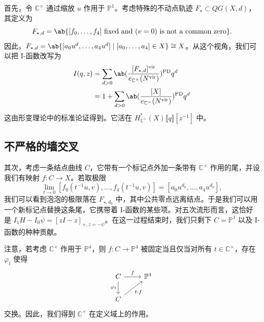 \documentclass{amsart}
\theoremstyle{definition}
\theoremstyle{remark}
\theoremstyle{plain}
\theoremstyle{definition}
\theoremstyle{remark}
\newcommand{\C}{\mathbb{C}}
\renewcommand{\P}{\mathbb{P}}
\newcommand{\mr}[1]{\mathrm{#1}}
\newcommand{\1}{\mathbf{1}}
\newcommand{\2}{\mathbf{2}}
\newcommand{\3}{\mathbf{3}}
\newcommand{\vir}{\mr{vir}}
\newcommand{\ps}[1]{\llbracket #1 \rrbracket}
\begin{document}
首先，令 \(\C^{\times}\) 通过缩放 \(u\) 作用于 \(\P^1\)。考虑特殊的不动点轨迹 \(F_{\star} \subset QG(X, d)\)，其定义为
\[ F_{\star,d} = \ab\{ [f_0, \ldots, f_4] \text{ fixed and } (v=0) \text{ is not a common zero} \}. \]
因此，\(F_{\star,d} = \ab\{ [a_0 u^d, \ldots, a_4 u^d] \mid [a_0, \ldots, a_4] \in X \} \cong X\)。从这个视角，我们可以把 I-函数改写为
\begin{align*}
    I(q,z) &= \sum_{d > 0} \ab(\frac{[F_{\star, d}]^{\vir}}{e_{\C^{\times}}(N^{\vir})})^{\mr{PD}} q^d \\
    &= 1 + \sum_{d > 0} \ab( \frac{[X]}{e_{\C^{\times}}(N^{\vir})})^{\mr{PD}} q^d
\end{align*}
这由形变理论中的标准论证得到。它活在 \(H^*_{\C^{\times}}(X) \ps{q}[z^{-1}]\) 中。

\subsection{不严格的墙交叉}%
\label{sub:Wall-crossing without rigor}


其次，考虑一条结点曲线 \(C\)，它带有一个标记点外加一条带有 \(\C^{\times}\) 作用的尾，并设我们有映射 \(f \colon C \to X\)。若取极限
\[ \lim_{t \to 0} [f_0(t^{-1}u, v), \ldots, f_4(t^{-1}u, v)] = [a_0 u^{d_0}, \ldots, a_4 u^{d_0}], \]
我们可以看到泡泡的极限落在 \(F_{\star, d_0}\) 中，其中公共零点远离结点。于是我们可以用一个新标记点替换这条尾，它携带着 I-函数的某些项。对五次流形而言，这恰好是 \(I_1 H - I_0 \psi = [zI-z]_{+, z = -\psi}\)。在这一过程结束时，我们只剩下 \(C = \P^1\) 以及 I-函数的种种贡献。

注意，若考虑 \(\C^{\times}\) 作用于 \(\P^4\)，则 \(f \colon C \to \P^4\) 被固定当且仅当对所有 \(t \in \C^{\times}\)，存在 \(\varphi_t\) 使得
\begin{equation*}
\begin{tikzcd}
    C \ar{r}{f} \ar{d}[swap]{\varphi_t} & \P^4 \\
    C \ar{ur}[swap]{t \cdot f}
\end{tikzcd}
\end{equation*}
交换。因此，我们得到 \(\C^{\times}\) 在定义域上的作用。
\end{document}
